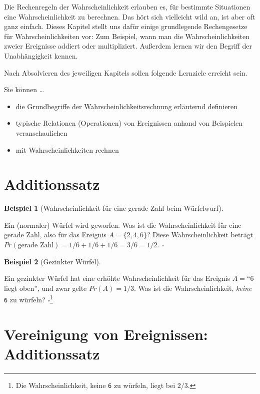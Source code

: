\documentclass[
  ngerman,
  letterpaper,
  twoside,
  open=any]{scrbook}
\providecommand{\tightlist}{%
  \setlength{\itemsep}{0pt}\setlength{\parskip}{0pt}}\usepackage{longtable,booktabs,array}
\theoremstyle{definition}
\newtheorem{example}{Beispiel}[chapter]
\theoremstyle{plain}
\theoremstyle{definition}
\theoremstyle{definition}
\theoremstyle{definition}
\newtheorem{example}{Beispiel}[chapter]
\theoremstyle{definition}
\theoremstyle{remark}
\begin{document}
Die Rechenregeln der Wahrscheinlichkeit erlauben es, für bestimmte
Situationen eine Wahrscheinlichkeit zu berechnen. Das hört sich
vielleicht wild an, ist aber oft ganz einfach. Dieses Kapitel stellt uns
dafür einige grundlegende Rechengesetze für Wahrscheinlichkeiten vor:
Zum Beispiel, wann man die Wahrscheinlichkeiten zweier Ereignisse
addiert oder multipliziert. Außerdem lernen wir den Begriff der
Unabhängigkeit kennen.

Nach Absolvieren des jeweiligen Kapitels sollen folgende Lernziele
erreicht sein.

Sie können \ldots{}

\begin{itemize}
\tightlist
\item
  die Grundbegriffe der Wahrscheinlichkeitsrechnung erläuternd
  definieren
\item
  typische Relationen (Operationen) von Ereignissen anhand von
  Beispielen veranschaulichen
\item
  mit Wahrscheinlichkeiten rechnen
\end{itemize}

\section{Additionssatz}\label{additionssatz}

\begin{example}[Wahrscheinlichkeit für eine gerade Zahl beim
Würfelwurf]\protect\hypertarget{exm-add-ereignisse}{}\label{exm-add-ereignisse}

Ein (normaler) Würfel wird geworfen. Was ist die Wahrscheinlichkeit für
eine gerade Zahl, also für das Ereignis \(A=\{2, 4, 6\}\)? Diese
Wahrscheinlichkeit beträgt
\(Pr(\text{gerade Zahl}) = 1/6 + 1/6 + 1/6 = 3/6 = 1/2\). \(\square\)

\end{example}

\begin{example}[Gezinkter
Würfel]\protect\hypertarget{exm-ind2}{}\label{exm-ind2}

Ein gezinkter Würfel hat eine erhöhte Wahrscheinlichkeit für das
Ereignis \(A=\)\enquote{6 liegt oben}, und zwar gelte \(Pr(A)=1/3\). Was
ist die Wahrscheinlichkeit, \emph{keine} \texttt{6} zu würfeln?
\(\square\)\footnote{Die Wahrscheinlichkeit, keine \texttt{6} zu
  würfeln, liegt bei \(2/3\).}

\end{example}

\section{Vereinigung von Ereignissen:
Additionssatz}\label{vereinigung-von-ereignissen-additionssatz}
\end{document}
